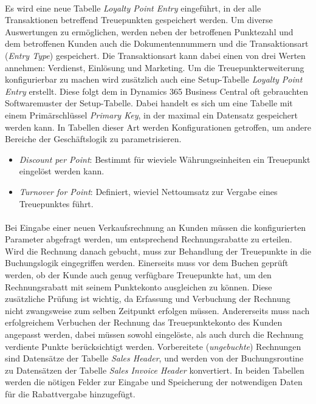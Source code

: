 \paragraph{}
Es wird eine neue Tabelle \textit{Loyalty Point Entry} eingeführt, in der alle Transaktionen betreffend Treuepunkten gespeichert werden. Um diverse Auswertungen zu ermöglichen, werden neben der betroffenen Punktezahl und dem betroffenen Kunden auch die Dokumentennummern und die Transaktionsart (\textit{Entry Type}) gespeichert. Die Transaktionsart kann dabei einen von drei Werten annehmen: Verdienst, Einlösung und Marketing. Um die Treuepunkterweiterung konfigurierbar zu machen wird zusätzlich auch eine Setup-Tabelle \textit{Loyalty Point Entry} erstellt. Diese folgt dem in Dynamics 365 Business Central oft gebrauchten Softwaremuster der Setup-Tabelle. Dabei handelt es sich um eine Tabelle mit einem Primärschlüssel \textit{Primary Key}, in der maximal ein Datensatz gespeichert werden kann. In Tabellen dieser Art werden Konfigurationen getroffen, um andere Bereiche der Geschäftslogik zu parametrisieren.

\begin{itemize}
	\item \textit{Discount per Point}: Bestimmt für wieviele Währungseinheiten ein Treuepunkt eingelöst werden kann.
	\item \textit{Turnover for Point}: Definiert, wieviel Nettoumsatz zur Vergabe eines Treuepunktes führt.
\end{itemize}

\paragraph{}
Bei Eingabe einer neuen Verkaufsrechnung an Kunden müssen die konfigurierten Parameter abgefragt werden, um entsprechend Rechnungsrabatte zu erteilen. Wird die Rechnung danach gebucht, muss zur Behandlung der Treuepunkte in die Buchungslogik eingegriffen werden. Einerseits muss vor dem Buchen geprüft werden, ob der Kunde auch genug verfügbare Treuepunkte hat, um den Rechnungsrabatt mit seinem Punktekonto ausgleichen zu können. Diese zusätzliche Prüfung ist wichtig, da Erfassung und Verbuchung der Rechnung nicht zwangsweise zum selben Zeitpunkt erfolgen müssen. Andererseits muss nach erfolgreichem Verbuchen der Rechnung das Treuepunktekonto des Kunden angepasst werden, dabei müssen sowohl eingelöste, als auch durch die Rechnung verdiente Punkte berücksichtigt werden. Vorbereitete (\textit{ungebuchte}) Rechnungen sind Datensätze der Tabelle \textit{Sales Header}, und werden von der Buchungsroutine zu Datensätzen der Tabelle \textit{Sales Invoice Header} konvertiert. In beiden Tabellen werden die nötigen Felder zur Eingabe und Speicherung der notwendigen Daten für die Rabattvergabe hinzugefügt.

